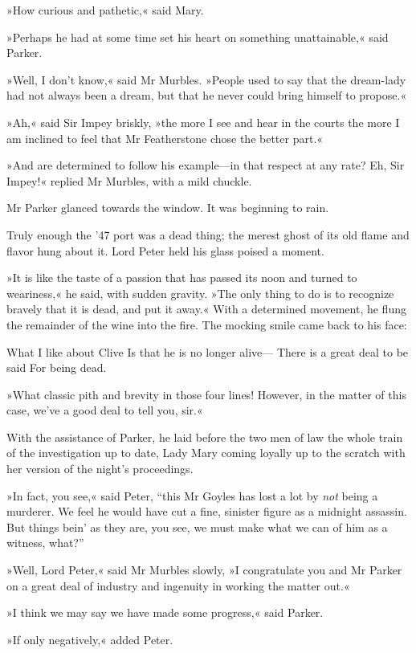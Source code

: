 »How curious and pathetic,« said Mary.

»Perhaps he had at some time set his heart on something unattainable,« said Parker.

»Well, I don't know,« said Mr Murbles. »People used to say that the dream-lady had not always been a dream, but that he never could bring himself to propose.«

»Ah,« said Sir Impey briskly, »the more I see and hear in the courts the more I am inclined to feel that Mr Featherstone chose the better part.«

»And are determined to follow his example\allowbreak---\allowbreak in that respect at any rate?  Eh, Sir Impey!« replied Mr Murbles, with a mild chuckle.

Mr Parker glanced towards the window. It was beginning to rain.

Truly enough the '47 port was a dead thing; the merest ghost of its old flame and flavor hung about it. Lord Peter held his glass poised a moment.

»It is like the taste of a passion that has passed its noon and turned to weariness,« he said, with sudden gravity. »The only thing to do is to recognize bravely that it is dead, and put it away.« With a determined movement, he flung the remainder of the wine into the fire.  The mocking smile came back to his face: 

What I like about Clive
Is that he is no longer alive—
There is a great deal to be said
For being dead.

 »What classic pith and brevity in those four lines! However, in the matter of this case, we've a good deal to tell you, sir.«

With the assistance of Parker, he laid before the two men of law the whole train of the investigation up to date, Lady Mary coming loyally up to the scratch with her version of the night's proceedings.

»In fact, you see,« said Peter, \enquote{this Mr Goyles has lost a lot by \textit{not} being a murderer. We feel he would have cut a fine, sinister figure as a midnight assassin. But things bein' as they are, you see, we must make what we can of him as a witness, what?}

»Well, Lord Peter,« said Mr Murbles slowly, »I congratulate you and Mr Parker on a great deal of industry and ingenuity in working the matter out.«

»I think we may say we have made some progress,« said Parker.

»If only negatively,« added Peter.

